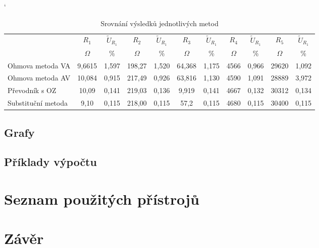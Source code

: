 \documentclass[a4paper, czech]{article}
\begin{document}
\begin{table}[H]
    \catcode`
    \centering
    \caption{Srovnání výsledků jednotlivých metod}
    \begin{tabular}{lcccccccccc}
        \toprule
        \multirow{2}{*}{}    & $R_1$     & $\tilde{U}_{R_1}$ & $R_2$      & $\tilde{U}_{R_1}$ & $R_3$     & $\tilde{U}_{R_1}$ & $R_4$       & $\tilde{U}_{R_1}$ & $R_5$    & $\tilde{U}_{R_1}$ \\
        \cmidrule(rl){2-3}
        \cmidrule(rl){4-5}
        \cmidrule(rl){6-7}
        \cmidrule(rl){8-9}
        \cmidrule(rl){10-11}
                            & $\Omega$      & \%    & $\Omega$       & \%    & $\Omega$      & \%    & $\Omega$        & \%    & $\Omega$     & \%    \\
        \midrule
        Ohmova   metoda VA   & 9,6615 & 1,597 & 198,27 & 1,520 & 64,368 & 1,175 & 4566 & 0,966 & 29620 & 1,092 \\
        Ohmova   metoda AV   & 10,084 & 0,915 & 217,49  & 0,926 & 63,816 & 1,130 & 4590   & 1,091 & 28889 & 3,972 \\
        Převodník   s OZ     & 10,09  & 0,141 & 219,03  & 0,136 & 9,919  & 0,141 & 4667     & 0,132 & 30312 & 0,134 \\
        Substituční   metoda & 9,10    & 0,115 & 218,00     & 0,115 & 57,2   & 0,115 & 4680     & 0,115 & 30400 & 0,115 \\
        \bottomrule
    \end{tabular}
\end{table}

\subsection{Grafy}

\subsection{Příklady výpočtu}

\section{Seznam použitých přístrojů}

\section{Závěr}
\end{document}
